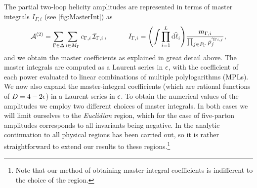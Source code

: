 The partial two-loop helicity amplitudes are represented in terms of master integrals $I_{\Gamma,i}$ (see \cref{fig:MasterInt}) as
\begin{equation} \label{eq:ampl_master_integrals}
  \mathcal{A}^{(2)}=\sum_{\Gamma\in\Delta}
  \sum_{i\in M_\Gamma} c_{\Gamma,i}\,
  \mathcal{I}_{\Gamma,i}\,,
  \quad
    \qquad I_{\Gamma,i} =
      \qty(\int \prod_{i=1}^{L} \tilde{\dd{\ell_i}}) \frac{m_{\Gamma,i}}{\prod_{j\in P_\Gamma} \rho_j^{\gamma_{\Gamma i,j}}},
\end{equation}
and we obtain the master coefficients as explained in great detail above.
The master integrals are computed as a Laurent series in $\epsilon$, 
with the coefficient of each power evaluated to linear combinations of multiple polylogarithms (MPLs). 
We now also expand the master-integral coefficients (which are rational functions of $D=4-2\epsilon$) in a Laurent series in $\epsilon$.
To obtain the numerical values of the amplitudes we employ two different choices of master integrals.
In both cases we will limit ourselves to the \emph{Euclidian} region, which for the case of five-parton
amplitudes corresponds to all invariants being negative. In \cite{Gehrmann:2018yef} the analytic
continuation to all physical regions has been carried out, so it is rather straightforward to extend
our results to these regions.\footnote{
  Note that our method of obtaining master-integral coefficients is indifferent to the choice of the region.
}

